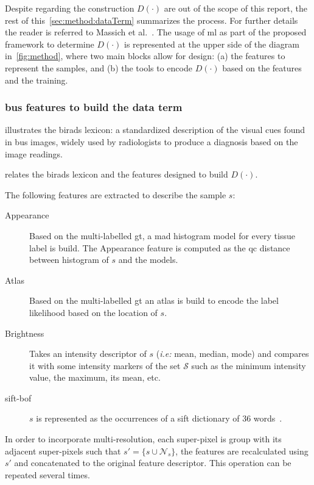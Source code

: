Despite regarding the construction $D(\cdot)$ are out of the scope of this report, the rest of this~\cref{sec:method:dataTerm} summarizes the process.
For further details the reader is referred to Massich et al.~\cite{massich2013phd}.
The usage of \ac{ml} as part of the proposed framework to determine $D(\cdot)$ is represented at the upper side of the diagram in~\cref{fig:method},
where two main blocks allow for design: 
(a) the features to represent the samples,
and (b) the tools to encode $D(\cdot)$ based on the features and the training. 

\subsubsection{\ac{bus} features to build the data term}
 illustrates the \ac{birads} lexicon: a standardized description of the visual cues found in \ac{bus} images, widely used by radiologists to produce a diagnosis based on the image readings. 

 relates the \ac{birads} lexicon and the features designed to build $D(\cdot)$.

The following features are extracted to describe the sample $s$:
\begin{description}
  \item[Appearance] 
    Based on the multi-labelled \ac{gt}, a \ac{mad} histogram model for every tissue label is build. The Appearance feature is computed as the \ac{qc} distance between histogram of $s$ and the models.
  \item[Atlas] 
    Based on the multi-labelled \ac{gt} an atlas is build to encode the label likelihood based on the location of $s$.
  \item[Brightness] 
    Takes an intensity descriptor of $s$ (\emph{i.e:} mean, median, mode) and compares it with some intensity markers of the set $\mathcal{S}$ such as the minimum intensity value, the maximum, its mean, etc.
  \item[\ac{sift}-\ac{bof}]
    $s$ is represented as the occurrences of a \ac{sift} dictionary of 36 words~\cite{massich2014sift}.
\end{description}

In order to incorporate multi-resolution, each super-pixel is group with its adjacent super-pixels such that $s' = \{s \cup \mathcal{N}_{s}\}$, the features are recalculated using $s'$ and concatenated to the original feature descriptor. This operation can be repeated several times.

